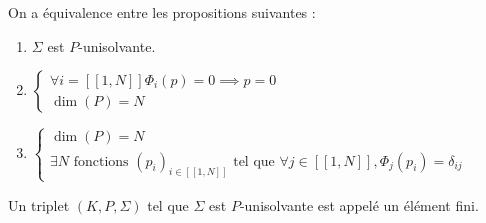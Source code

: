 \documentclass[12pt,a4paper]{article}
\begin{document}
		\begin{prop}
			On a équivalence entre les propositions suivantes :
			\begin{enumerate}[label=$\star$]
				\item $\Sigma$ est $P$-unisolvante.
				
				\item $\begin{cases}
					\forall i = [\![1, N]\!] \Phi_i(p) = 0 \implies p = 0\\
					\dim(P) = N
				\end{cases}$
				
				\item $\begin{cases}
					\dim(P) = N \\
					\exists N \text{ fonctions } (p_i)_{i\in[\![1,N]\!]} \text{ tel que } \forall j \in [\![1,N]\!], \Phi_j(p_i) = \delta_{ij}
				\end{cases}$
			\end{enumerate}
		\end{prop}
		
		\begin{defi}
			\begin{minipage}[t]{18.5cm}
				Un triplet $(K,P,\Sigma)$ tel que $\Sigma$ est $P$-unisolvante est appelé un élément fini.
			\end{minipage}
		\end{defi}
		
\end{document}
